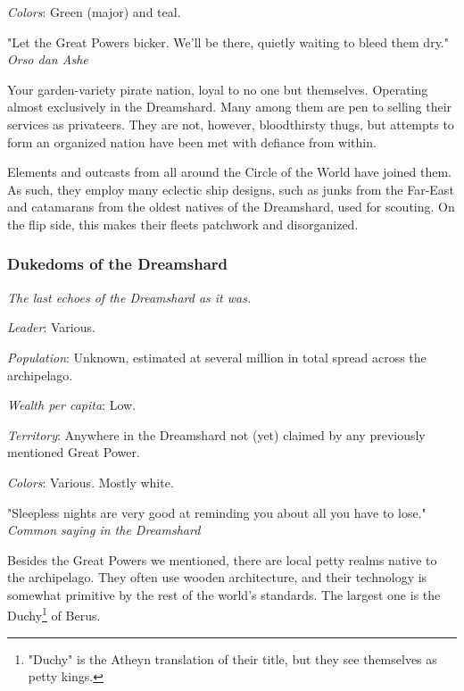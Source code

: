 \textit{Colors}: Green (major) and teal.

\begin{rpg-quotebox}
    "Let the Great Powers bicker. We'll be there, quietly waiting to bleed them dry." \\ \textendash \textit{Orso dan Ashe}
\end{rpg-quotebox}

Your garden-variety pirate nation, loyal to no one but themselves. Operating almost exclusively in the Dreamshard. Many among them are pen to selling their services as privateers. They are not, however, bloodthirsty thugs, but attempts to form an organized nation have been met with defiance from within.

Elements and outcasts from all around the Circle of the World have joined them. As such, they employ many eclectic ship designs, such as junks from the Far-East and catamarans from the oldest natives of the Dreamshard, used for scouting. On the flip side, this makes their fleets patchwork and disorganized.  

\subsubsection{Dukedoms of the Dreamshard}

\textit{The last echoes of the Dreamshard as it was.}

\textit{Leader}: Various.

\textit{Population}: Unknown, estimated at several million in total spread across the archipelago.

\textit{Wealth per capita}: Low.

\textit{Territory}: Anywhere in the Dreamshard not (yet) claimed by any previously mentioned Great Power.
    
\textit{Colors}: Various. Mostly white.

\begin{rpg-quotebox}
    "Sleepless nights are very good at reminding you about all you have to lose." \\ \textendash \textit{Common saying in the Dreamshard}
\end{rpg-quotebox}

Besides the Great Powers we mentioned, there are local petty realms native to the archipelago. They often use wooden architecture, and their technology is somewhat primitive by the rest of the world's standards. The largest one is the Duchy\footnote{"Duchy" is the Atheyn translation of their title, but they see themselves as petty kings.} of Berus.

